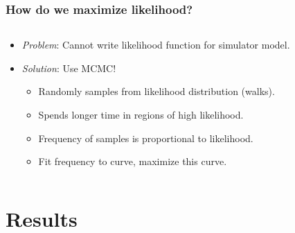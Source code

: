 \documentclass[11pt]{beamer}
\begin{document}
    \begin{frame}
        \frametitle{How do we maximize likelihood?}
        \begin{columns}
            \begin{column}{0.6\textwidth}
                \begin{itemize}
                    \item \emph{Problem}: Cannot write likelihood function for simulator model. \bigskip
                    \item \emph{Solution}: Use MCMC!
                        \begin{itemize}
                            \item Randomly samples from likelihood distribution (walks).
                            \item Spends longer time in regions of high likelihood.
                            \item Frequency of samples is proportional to likelihood.
                            \item Fit frequency to curve, maximize this curve.
                        \end{itemize}
                \end{itemize}
            \end{column}
            \begin{column}{0.4\textwidth}
                \begin{flushleft}
                    
                \end{flushleft}
            \end{column}
        \end{columns}

        \note{
            \footnotesize
            \begin{enumerate}
                \item
            \end{enumerate}
        }
    \end{frame}

    \section{Results}\label{sec:r}
\end{document}
